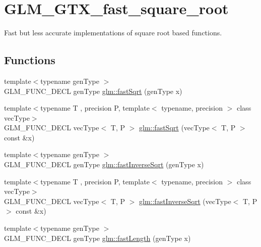 \hypertarget{group__gtx__fast__square__root}{}\section{G\+L\+M\+\_\+\+G\+T\+X\+\_\+fast\+\_\+square\+\_\+root}
\label{group__gtx__fast__square__root}


Fast but less accurate implementations of square root based functions.  


\subsection*{Functions}
\begin{DoxyCompactItemize}
\item 
{\footnotesize template$<$typename gen\+Type $>$ }\\G\+L\+M\+\_\+\+F\+U\+N\+C\+\_\+\+D\+E\+C\+L gen\+Type \hyperlink{group__gtx__fast__square__root_ga6c460e9414a50b2fc455c8f64c86cdc9}{glm\+::fast\+Sqrt} (gen\+Type x)
\item 
{\footnotesize template$<$typename T , precision P, template$<$ typename, precision $>$ class vec\+Type$>$ }\\G\+L\+M\+\_\+\+F\+U\+N\+C\+\_\+\+D\+E\+C\+L vec\+Type$<$ T, P $>$ \hyperlink{group__gtx__fast__square__root_gaad9f601bbc3faa04dda384e4c4e1592c}{glm\+::fast\+Sqrt} (vec\+Type$<$ T, P $>$ const \&x)
\item 
{\footnotesize template$<$typename gen\+Type $>$ }\\G\+L\+M\+\_\+\+F\+U\+N\+C\+\_\+\+D\+E\+C\+L gen\+Type \hyperlink{group__gtx__fast__square__root_ga7f081b14d9c7035c8714eba5f7f75a8f}{glm\+::fast\+Inverse\+Sqrt} (gen\+Type x)
\item 
{\footnotesize template$<$typename T , precision P, template$<$ typename, precision $>$ class vec\+Type$>$ }\\G\+L\+M\+\_\+\+F\+U\+N\+C\+\_\+\+D\+E\+C\+L vec\+Type$<$ T, P $>$ \hyperlink{group__gtx__fast__square__root_ga903878071f92e51e551791e584a171a1}{glm\+::fast\+Inverse\+Sqrt} (vec\+Type$<$ T, P $>$ const \&x)
\item 
{\footnotesize template$<$typename gen\+Type $>$ }\\G\+L\+M\+\_\+\+F\+U\+N\+C\+\_\+\+D\+E\+C\+L gen\+Type \hyperlink{group__gtx__fast__square__root_gafe697d6287719538346bbdf8b1367c59}{glm\+::fast\+Length} (gen\+Type x)
\item 

\end{DoxyCompactItemize}
